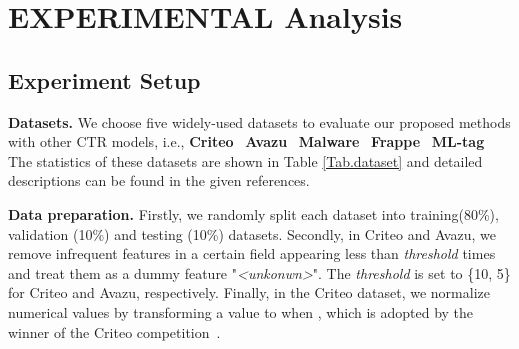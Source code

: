 \documentclass[sigconf]{acmart}
\begin{document}
\section{EXPERIMENTAL Analysis}
\label{sec:exp_all}



\subsection{Experiment Setup}
\label{sec_exp}

\textbf{Datasets.}
We choose five widely-used datasets to evaluate our proposed methods with other CTR models, i.e., \textbf{Criteo}~\cite{kaggle_criteo, zhu2020fuxictr,wang2022enhancing}
\textbf{Avazu}~\cite{avazu,song2019autoint,meng2021autopi}
\textbf{Malware}~\cite{malware,wang2021masknet}
\textbf{Frappe}~\cite{baltrunas2015frappe, xiao2017attentional, cheng2020adaptive}
\textbf{ML-tag}~\cite{mltag,xiao2017attentional,cheng2020adaptive}
The statistics of these datasets are shown in Table \ref{Tab.dataset} and detailed descriptions can be found in the given references.


\textbf{Data preparation.} Firstly, we randomly split each dataset into training(80\%), validation (10\%) and testing (10\%) datasets. Secondly, in Criteo and Avazu, we remove infrequent features in a certain field appearing less than \textit{threshold} times and treat them as a dummy feature "\textit{<unkonwn>}". The \textit{threshold} is set to \{10, 5\} for Criteo and Avazu, respectively. Finally, in the Criteo dataset, we normalize numerical values by transforming a value  to  when , which is adopted by the winner of the Criteo competition~\cite{winner}.


\begin{table}[t]
\setlength{\belowcaptionskip}{-0.2cm}
 \centering
 \caption{Dataset statistics. K means thousand.}
 \label{Tab.dataset}
\end{table}
\end{document}
